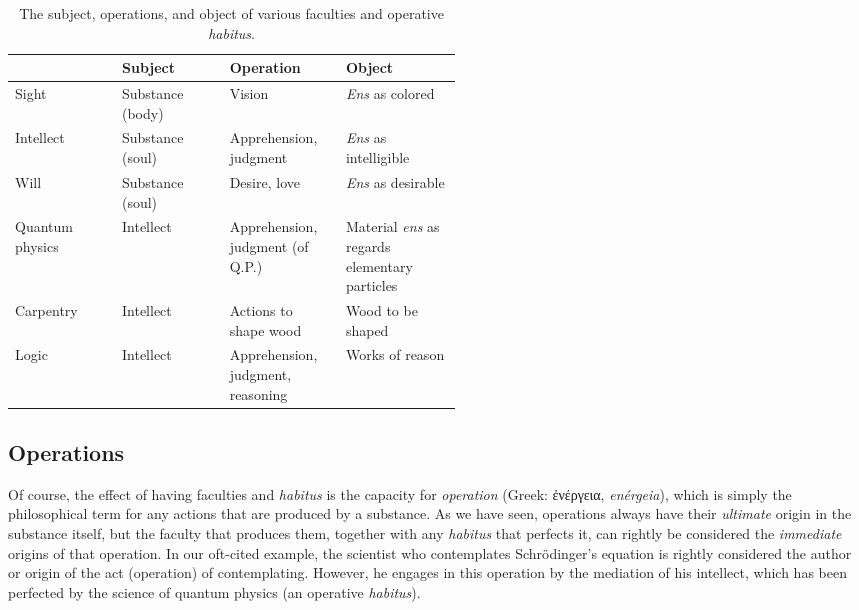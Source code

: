 \documentclass[article,12pt,a4paper,oneside]{memoir}
\begin{document}
    \begin{table}[ht]
    \begin{center}
    \caption{The subject, operations, and object of various faculties and operative \emph{habitus}.}
    \label{tab:subject-operation-object}
    {
    \disablehyphenation
    \small
    \begin{tabular}{l|l|>{\raggedright}p{0.26\linewidth}|p{0.26\linewidth}}
    \toprule
     & Subject & Operation & Object \\
    \midrule
    Sight & Substance (body) & Vision & \emph{Ens} as colored \\ 
    Intellect & Substance (soul) & Apprehension, judgment & \emph{Ens} as intelligible \\
    Will & Substance (soul) & Desire, love & \emph{Ens} as desirable \\
    \midrule
    Quantum physics & Intellect & Apprehension, judgment (of Q.P.) & Material \emph{ens} as regards elementary particles \\
    \midrule
    Carpentry & Intellect & Actions to shape wood & Wood to be shaped \\
    \midrule
    Logic & Intellect & Apprehension, judgment, reasoning & Works of reason \\
    \bottomrule
    \end{tabular}
    }
    \end{center}
    \end{table}

    \hypertarget{operations}{%
    \subsection{Operations}\label{operations}}

    Of course, the effect of having faculties and \emph{habitus} is the
    capacity for \emph{operation} (Greek: ἐνέργεια, \emph{enérgeia}),
    which is simply the philosophical term for any actions that are
    produced by a substance. As we have seen, operations always have
    their \emph{ultimate} origin in the substance itself, but the
    faculty that produces them, together with any \emph{habitus} that
    perfects it, can rightly be considered the \emph{immediate} origins
    of that operation. In our oft-cited example, the scientist who
    contemplates Schrödinger's equation is rightly considered the author
    or origin of the act (operation) of contemplating. However, he
    engages in this operation by the mediation of his intellect, which
    has been perfected by the science of quantum physics (an operative
    \emph{habitus}).
\end{document}
